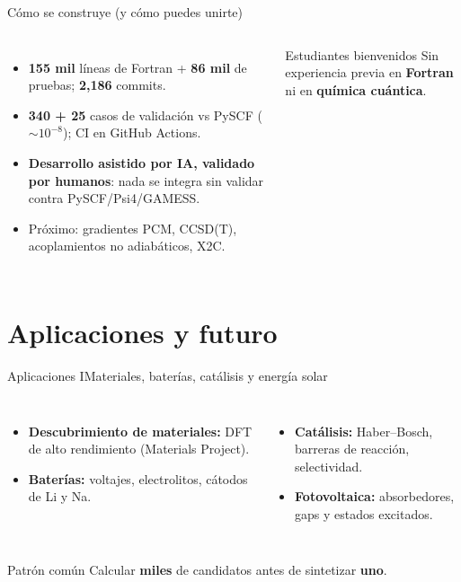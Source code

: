 \documentclass[aspectratio=169]{beamer}
\begin{document}
\begin{frame}{Cómo se construye (y cómo puedes unirte)}
  \begin{columns}[T,onlytextwidth]
      \begin{itemize}\setlength\itemsep{3pt}
        \item \textbf{155 mil} líneas de Fortran + \textbf{86 mil} de pruebas; \textbf{2,186} commits.
        \item \textbf{340 + 25} casos de validación vs PySCF ($\sim\!10^{-8}$); CI en GitHub Actions.
        \item \textbf{Desarrollo asistido por IA, validado por humanos}: nada se integra sin validar contra PySCF/Psi4/GAMESS.
        \item Próximo: gradientes PCM, CCSD(T), acoplamientos no adiabáticos, X2C.
      \end{itemize}
      \begin{exampleblock}{Estudiantes bienvenidos}
        Sin experiencia previa en \textbf{Fortran} ni en \textbf{química cuántica}.
      \end{exampleblock}
  \end{columns}
\end{frame}

\section{Aplicaciones y futuro}

\begin{frame}{Aplicaciones I}{Materiales, baterías, catálisis y energía solar}
  \begin{columns}[T,onlytextwidth]
      \begin{itemize}\setlength\itemsep{5pt}
        \item \textbf{Descubrimiento de materiales:} DFT de alto rendimiento (Materials Project).
        \item \textbf{Baterías:} voltajes, electrolitos, cátodos de Li y Na.
      \end{itemize}
      \begin{itemize}\setlength\itemsep{5pt}
        \item \textbf{Catálisis:} Haber--Bosch, barreras de reacción, selectividad.
        \item \textbf{Fotovoltaica:} absorbedores, gaps y estados excitados.
      \end{itemize}
  \end{columns}
  \vspace{.8em}
  \begin{exampleblock}{Patrón común}
    Calcular \textbf{miles} de candidatos antes de sintetizar \textbf{uno}.
  \end{exampleblock}
\end{frame}
\end{document}

